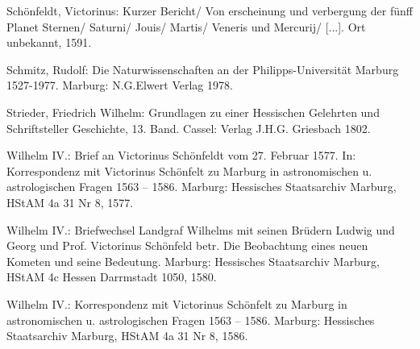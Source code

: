 \documentclass[12pt]{article}
\begin{document}
\begin{thebibliography}{}
 Schönfeldt, Victorinus: Kurzer Bericht/ Von erscheinung und verbergung der fünff Planet Sternen/ Saturni/ Jouis/ Martis/ Veneris und Mercurij/ [...]. Ort unbekannt, 1591.

 Schmitz, Rudolf: Die Naturwissenschaften an der Philipps-Universität Marburg 1527-1977. Marburg: N.G.Elwert Verlag 1978. 

 Strieder, Friedrich Wilhelm: Grundlagen zu einer Hessischen Gelehrten und Schriftsteller Geschichte, 13. Band. Cassel: Verlag J.H.G. Griesbach 1802.

 Wilhelm IV.: Brief an Victorinus Schönfeldt vom 27. Februar 1577. In: Korrespondenz mit Victorinus Schönfelt zu Marburg in astronomischen u. astrologischen Fragen 1563 – 1586. Marburg: Hessisches Staatsarchiv Marburg, HStAM 4a 31 Nr 8, 1577.

 Wilhelm IV.: Briefwechsel Landgraf Wilhelms mit seinen Brüdern Ludwig und Georg und Prof. Victorinus Schönfeld betr. Die Beobachtung eines neuen Kometen und seine Bedeutung. Marburg: Hessisches Staatsarchiv Marburg, HStAM 4c Hessen Darrmstadt 1050, 1580.

 Wilhelm IV.: Korrespondenz mit Victorinus Schönfelt zu Marburg in astronomischen u. astrologischen Fragen 1563 – 1586. Marburg: Hessisches Staatsarchiv Marburg, HStAM 4a 31 Nr 8, 1586.

\end{thebibliography}
\end{document}
